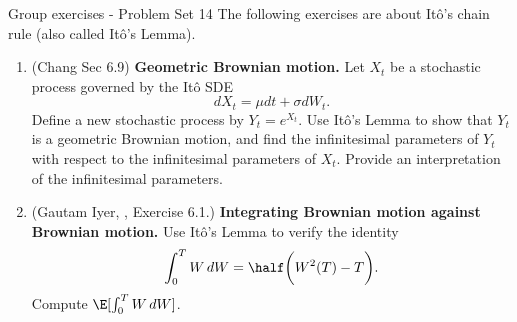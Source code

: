 \documentclass[10pt]{beamer}
\begin{document}
\begin{frame}{Group exercises - Problem Set 14}
\small 
The following exercises are about It\^{o}'s chain rule (also called It\^{o}'s Lemma). 
\begin{enumerate}
	\item (Chang Sec 6.9) \textbf{Geometric Brownian motion.}    Let $X_t$ be a stochastic process governed by the It\^{o} SDE 
	\[dX_t = \mu dt + \sigma dW_t.\]  
	Define a new stochastic process by $Y_t = e^{X_t}.$ Use It\^{o}'s Lemma to show that $Y_t$ is a geometric Brownian motion, and find the infinitesimal parameters of $Y_t$ with respect to the infinitesimal parameters of $X_t$. Provide an interpretation of the infinitesimal parameters.
	\item (Gautam Iyer, \textit{\href{https://www.math.cmu.edu/~gautam/sj/teaching/2021-22/944-scalc-finance1/pdfs/ch3-int.pdf}{\underline{}}}, Exercise 6.1.) \textbf{Integrating Brownian motion against Brownian motion.}   Use It\^{o}'s Lemma to verify the identity
	\[ \int_0^T W \, dW = \half \bigg( W^2(T) - T \bigg). \]
	Compute $\E[\int_0^T W \, dW]$.
\end{enumerate}





\end{frame}
\end{document}
